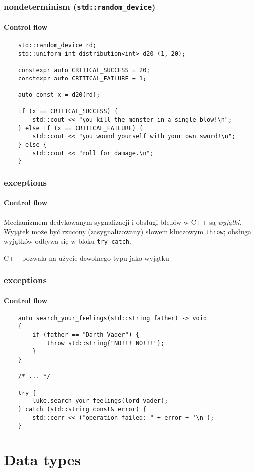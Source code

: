 \documentclass[aspectratio=169]{beamer}
\begin{document}
\begin{frame}[fragile]
    \frametitle{nondeterminism ({\tt std::random\_device})}
    \framesubtitle{Control flow}

    {\footnotesize
    \begin{lstlisting}
    std::random_device rd;
    std::uniform_int_distribution<int> d20 (1, 20);

    constexpr auto CRITICAL_SUCCESS = 20;
    constexpr auto CRITICAL_FAILURE = 1;

    auto const x = d20(rd);

    if (x == CRITICAL_SUCCESS) {
        std::cout << "you kill the monster in a single blow!\n";
    } else if (x == CRITICAL_FAILURE) {
        std::cout << "you wound yourself with your own sword!\n";
    } else {
        std::cout << "roll for damage.\n";
    }
    \end{lstlisting}}
\end{frame}

\begin{frame}
    \frametitle{exceptions}
    \framesubtitle{Control flow}

    Mechanizmem dedykowanym sygnalizacji i obsługi błędów w C++ są
    \emph{wyjątki}. Wyjątek może być rzucony (zasygnalizowany) słowem kluczowym
    {\tt throw}; obsługa wyjątków odbywa się w bloku {\tt try-catch}.

    \vspace{1em}

    C++ pozwala na użycie dowolnego typu jako wyjątku.
\end{frame}

\begin{frame}[fragile]
    \frametitle{exceptions}
    \framesubtitle{Control flow}

    {\footnotesize
    \begin{lstlisting}
    auto search_your_feelings(std::string father) -> void
    {
        if (father == "Darth Vader") {
            throw std::string{"NO!!! NO!!!"};
        }
    }

    /* ... */

    try {
        luke.search_your_feelings(lord_vader);
    } catch (std::string const& error) {
        std::cerr << ("operation failed: " + error + '\n');
    }
    \end{lstlisting}}
\end{frame}

\section{Data types}
\end{document}
